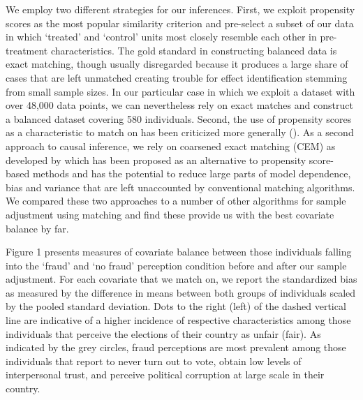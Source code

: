 \documentclass[11pt, ngerman,english,a4]{article}
\begin{document}
We employ two different strategies for our inferences. First, we exploit propensity scores as the most popular similarity criterion and pre-select a subset of our data in which `treated' and `control' units most closely resemble each other in pre-treatment characteristics. The gold standard in constructing balanced data is exact matching, though usually disregarded because it produces a large share of cases that are left unmatched creating trouble for effect identification stemming from small sample sizes. In our particular case in which we exploit a dataset with over 48,000 data points, we can nevertheless rely on exact matches and construct a balanced dataset covering 580 individuals. Second, the use of propensity scores as a characteristic to match on has been criticized more generally (\citealt{King2019}). As a second approach to causal inference, we rely on coarsened exact matching (CEM) as developed by \citet{Iacus2012} which has been proposed as an alternative to propensity score-based methods and has the potential to reduce large parts of model dependence, bias and variance that are left unaccounted by conventional matching algorithms. We compared these two approaches to a number of other algorithms for sample adjustment using matching and find these provide us with the best covariate balance by far. 

Figure 1 presents measures of covariate balance between those individuals falling into the `fraud' and `no fraud' perception condition before and after our sample adjustment. For each covariate that we match on, we report the standardized bias as measured by the difference in means between both groups of individuals scaled by the pooled standard deviation. Dots to the right (left) of the dashed vertical line are indicative of a higher incidence of respective characteristics among those individuals that perceive the elections of their country as unfair (fair). As indicated by the grey circles, fraud perceptions are most prevalent among those individuals that report to never turn out to vote, obtain low levels of interpersonal trust, and perceive political corruption at large scale in their country. 
\end{document}
